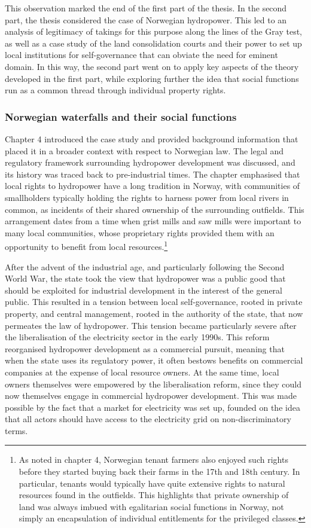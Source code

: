 This observation marked the end of the first part of the thesis. In the second part, the thesis considered the case of Norwegian hydropower. This led to an analysis of legitimacy of takings for this purpose along the lines of the Gray test, as well as a case study of the land consolidation courts and their power to set up local institutions for self-governance that can obviate the need for eminent domain. In this way, the second part went on to apply key aspects of the theory developed in the first part, while exploring further the idea that social functions run as a common thread through individual property rights.

\subsubsection*{Norwegian waterfalls and their social functions}

Chapter 4 introduced the case study and provided background information that placed it in a broader context with respect to Norwegian law. The legal and regulatory framework surrounding hydropower development was discussed, and its history was traced back to pre-industrial times. The chapter emphasised that local rights to hydropower have a long tradition in Norway, with communities of smallholders typically holding the rights to harness power from local rivers in common, as incidents of their shared ownership of the surrounding outfields. This arrangement dates from a time when grist mills and saw mills were important to many local communities, whose proprietary rights provided them with an opportunity to benefit from local resources.\footnote{As noted in chapter 4, Norwegian tenant farmers also enjoyed such rights before they started buying back their farms in the 17th and 18th century. In particular, tenants would typically have quite extensive rights to natural resources found in the outfields. This highlights that private ownership of land was always imbued with egalitarian social functions in Norway, not simply an encapsulation of individual entitlements for the privileged classes.} 

After the advent of the industrial age, and particularly following the Second World War, the state took the view that hydropower was a public good that should be exploited for industrial development in the interest of the general public. This resulted in a tension between local self-governance, rooted in private property, and central management, rooted in  the authority of the state, that now permeates the law of hydropower. This tension became particularly severe after the liberalisation of the electricity sector in the early 1990s. This reform reorganised hydropower development as a commercial pursuit, meaning that when the state uses its regulatory power, it often bestows benefits on commercial companies at the expense of local resource owners. At the same time, local owners themselves were empowered by the liberalisation reform, since they could now themselves engage in commercial hydropower development. This was made possible by the fact that a market for electricity was set up, founded on the idea that all actors should have access to the electricity grid on non-discriminatory terms.

